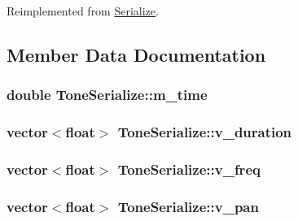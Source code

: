 Reimplemented from \hyperlink{classSerialize_ac94a76de6c9376e33b4c195d50ff0568}{Serialize}.



\subsection{Member Data Documentation}
\hypertarget{classToneSerialize_aa17b08f9fbad9ad86eb39f6b87843948}{
\subsubsection[{m\-\_\-time}]{\setlength{\rightskip}{0pt plus 5cm}double Tone\-Serialize\-::m\-\_\-time}}\label{classToneSerialize_aa17b08f9fbad9ad86eb39f6b87843948}
\hypertarget{classToneSerialize_a01cf609e28a438fc1effb03c656b33d6}{
\subsubsection[{v\-\_\-duration}]{\setlength{\rightskip}{0pt plus 5cm}vector$<$float$>$ Tone\-Serialize\-::v\-\_\-duration\hspace{0.3cm}{\ttfamily [private]}}}\label{classToneSerialize_a01cf609e28a438fc1effb03c656b33d6}
\hypertarget{classToneSerialize_a5888cb2c1c082334173c99c5cb4cbbc0}{
\subsubsection[{v\-\_\-freq}]{\setlength{\rightskip}{0pt plus 5cm}vector$<$float$>$ Tone\-Serialize\-::v\-\_\-freq\hspace{0.3cm}{\ttfamily [private]}}}\label{classToneSerialize_a5888cb2c1c082334173c99c5cb4cbbc0}
\hypertarget{classToneSerialize_acab1f55a7935a7a20358ef96785d9576}{
\subsubsection[{v\-\_\-pan}]{\setlength{\rightskip}{0pt plus 5cm}vector$<$float$>$ Tone\-Serialize\-::v\-\_\-pan\hspace{0.3cm}{\ttfamily [private]}}}\label{classToneSerialize_acab1f55a7935a7a20358ef96785d9576}
